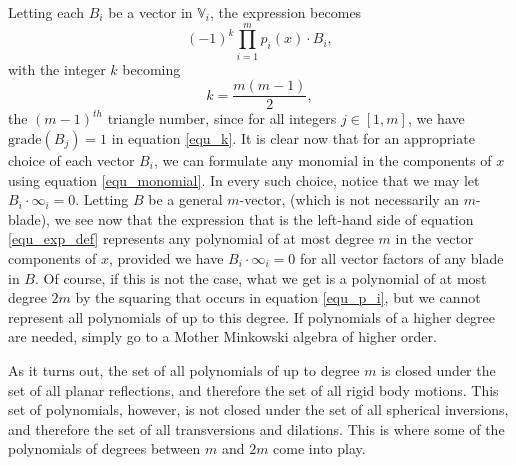 \documentclass{birkjour}
\theoremstyle{definition}
\theoremstyle{remark}
\numberwithin{equation}{section}
\newcommand{\V}{\mathbb{V}}
\newcommand{\nvai}{\infty}
\newcommand{\grade}{\mbox{grade}}
\begin{document}
Letting each $B_i$ be a vector in $\V_i$, the expression becomes
\begin{equation}\label{equ_monomial}
(-1)^k\prod_{i=1}^m p_i(x)\cdot B_i,
\end{equation}
with the integer $k$ becoming
\begin{equation}\label{equ_tri_numb}
k = \frac{m(m-1)}{2},
\end{equation}
the $(m-1)^{th}$ triangle number, since for all integers $j\in[1,m]$, we have $\grade(B_j)=1$ in
equation \eqref{equ_k}.
It is clear now that for an appropriate choice of each vector $B_i$, we can formulate any
monomial in the components of $x$ using equation \eqref{equ_monomial}.  In
every such choice, notice that we may let $B_i\cdot\nvai_i=0$.
Letting $B$ be a general $m$-vector, (which is not necessarily an $m$-blade),
we see now that the expression
that is the left-hand side of equation \eqref{equ_exp_def} represents
any polynomial of at most degree $m$
in the vector components of $x$, provided we have $B_i\cdot\nvai_i=0$
for all vector factors of any blade in $B$.
Of course, if this is not the case, what
we get is a polynomial of at most degree $2m$ by the squaring that
occurs in equation \eqref{equ_p_i}, but we cannot represent all polynomials
of up to this degree.  If polynomials of a higher degree are needed, simply go to a
Mother Minkowski algebra of higher order.

As it turns out, the set of all polynomials of up to degree $m$ is closed under
the set of all planar reflections, and therefore the set of all
rigid body motions.  This set of polynomials, however, is not closed under the
set of all spherical inversions, and therefore the set of all
transversions and dilations.  This is where some of the polynomials of degrees
between $m$ and $2m$ come into play.
\end{document}
